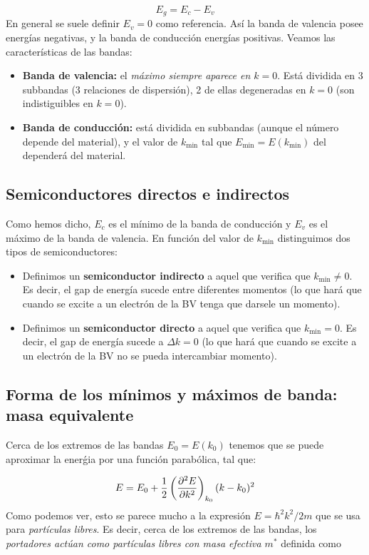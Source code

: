 \begin{equation}
	E_g = E_c - E_v
\end{equation}
En general se suele definir $E_v=0$ como referencia. Así la banda de valencia posee energías negativas, y la banda de conducción energías positivas. Veamos las características de las bandas:

\begin{itemize}
	\item \textbf{Banda de valencia:} el \textit{máximo siempre aparece en $k=0$}. Está dividida en 3 subbandas (3 relaciones de dispersión), 2 de ellas degeneradas en $k=0$ (son indistiguibles en $k=0$). 
	\item \textbf{Banda de conducción:} está dividida en subbandas (aunque el número depende del material), y el valor de $k_{\min}$ tal que $E_{\min}=E(k_{\min})$ del dependerá del material. 
\end{itemize}


\subsection{Semiconductores directos e indirectos}

Como hemos dicho, $E_c$ es el mínimo de la banda de conducción y $E_v$ es el máximo de la banda de valencia. En función del valor de $k_{\min}$ distinguimos dos tipos de semiconductores:
\begin{itemize}
	\item Definimos un \textbf{semiconductor indirecto} a aquel que verifica que $k_{\min}\neq0$. Es decir, el gap de energía sucede entre diferentes momentos (lo que hará que cuando se excite a un electrón de la BV tenga que darsele un momento).
	\item Definimos un \textbf{semiconductor directo} a aquel que verifica que $k_{\min}=0$. Es decir, el gap de energía sucede a $\Delta k =0$ (lo que hará que cuando se excite a un electrón de la BV no se pueda intercambiar momento).
\end{itemize}


\subsection{Forma de los mínimos y máximos de banda: masa equivalente}

Cerca de los extremos de las bandas $E_0=E(k_0)$ tenemos que se puede aproximar la enerǵia por una función parabólica, tal que:

\begin{equation}
	E = E_0 + \frac{1}{2} \left( \frac{\partial ^2E}{\partial k^2} \right)_{k_0} (k-k_0)^2 
\end{equation}
Como podemos ver, esto se parece mucho a la expresión $E=\hbar^2k^2/2m$ que se usa para \textit{partículas libres}. Es decir, cerca de los extremos de las bandas, los \textit{portadores actúan como partículas libres con masa efectiva $m^*$} definida como

